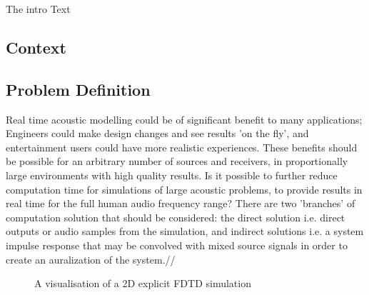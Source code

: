\documentclass[../Main.tex]{subfiles}
\begin{document}
The intro Text

\subsection{Context}

\subsection{Problem Definition}
Real time acoustic modelling could be of significant benefit to many applications; Engineers could make design changes and see results 'on the fly', and entertainment users could have more realistic experiences. These benefits should be possible for an arbitrary number of sources and receivers, in proportionally large environments with high quality results. Is it possible to further reduce computation time for simulations of large acoustic problems, to provide results in real time for the full human audio frequency range? There are two 'branches' of computation solution that should be considered: the direct solution i.e. direct outputs or audio samples from the simulation, and indirect solutions i.e. a system impulse response that may be convolved with mixed source signals in order to create an auralization of the system.//


\begin{figure}
\centering
\centering
\caption{A visualisation of a 2D explicit FDTD simulation ~\cite{Durbridge2016a}}
\end{figure}
\end{document}
